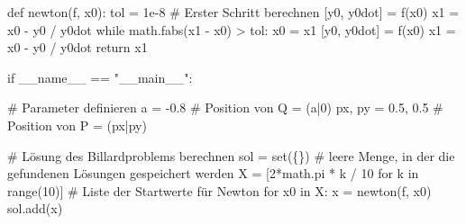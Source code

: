 \documentclass[
  a4paper,
  DIV=11]{scrreprt}
\newenvironment{Shaded}{\begin{snugshade}}{\end{snugshade}}
\newcommand{\BuiltInTok}[1]{\textcolor[rgb]{0.00,0.23,0.31}{#1}}
\newcommand{\CommentTok}[1]{\textcolor[rgb]{0.37,0.37,0.37}{#1}}
\newcommand{\ControlFlowTok}[1]{\textcolor[rgb]{0.00,0.23,0.31}{#1}}
\newcommand{\DecValTok}[1]{\textcolor[rgb]{0.68,0.00,0.00}{#1}}
\newcommand{\FloatTok}[1]{\textcolor[rgb]{0.68,0.00,0.00}{#1}}
\newcommand{\KeywordTok}[1]{\textcolor[rgb]{0.00,0.23,0.31}{#1}}
\newcommand{\NormalTok}[1]{\textcolor[rgb]{0.00,0.23,0.31}{#1}}
\newcommand{\OperatorTok}[1]{\textcolor[rgb]{0.37,0.37,0.37}{#1}}
\newcommand{\StringTok}[1]{\textcolor[rgb]{0.13,0.47,0.30}{#1}}
\newcommand{\VariableTok}[1]{\textcolor[rgb]{0.07,0.07,0.07}{#1}}
\theoremstyle{definition}
\theoremstyle{definition}
\theoremstyle{remark}
\begin{document}
\begin{tcolorbox}
\begin{Shaded}
\begin{Highlighting}[]
\KeywordTok{def}\NormalTok{ newton(f, x0):}
\NormalTok{    tol }\OperatorTok{=} \FloatTok{1e{-}8}
    \CommentTok{\# Erster Schritt berechnen}
\NormalTok{    [y0, y0dot] }\OperatorTok{=}\NormalTok{ f(x0)}
\NormalTok{    x1 }\OperatorTok{=}\NormalTok{ x0 }\OperatorTok{{-}}\NormalTok{ y0 }\OperatorTok{/}\NormalTok{ y0dot}
    \ControlFlowTok{while}\NormalTok{ math.fabs(x1 }\OperatorTok{{-}}\NormalTok{ x0) }\OperatorTok{\textgreater{}}\NormalTok{ tol:}
\NormalTok{        x0 }\OperatorTok{=}\NormalTok{ x1}
\NormalTok{        [y0, y0dot] }\OperatorTok{=}\NormalTok{ f(x0)}
\NormalTok{        x1 }\OperatorTok{=}\NormalTok{ x0 }\OperatorTok{{-}}\NormalTok{ y0 }\OperatorTok{/}\NormalTok{ y0dot}
    \ControlFlowTok{return}\NormalTok{ x1 }


\ControlFlowTok{if} \VariableTok{\_\_name\_\_} \OperatorTok{==} \StringTok{"\_\_main\_\_"}\NormalTok{:}

    \CommentTok{\# Parameter definieren}
\NormalTok{    a }\OperatorTok{=} \OperatorTok{{-}}\FloatTok{0.8}           \CommentTok{\# Position von Q = (a|0)}
\NormalTok{    px, py }\OperatorTok{=} \FloatTok{0.5}\NormalTok{, }\FloatTok{0.5}  \CommentTok{\# Position von P = (px|py)}

    \CommentTok{\# Lösung des Billardproblems berechnen}
\NormalTok{    sol }\OperatorTok{=} \BuiltInTok{set}\NormalTok{(\{\}) }\CommentTok{\# leere Menge, in der die gefundenen Lösungen gespeichert werden}
\NormalTok{    X }\OperatorTok{=}\NormalTok{ [}\DecValTok{2}\OperatorTok{*}\NormalTok{math.pi }\OperatorTok{*}\NormalTok{ k }\OperatorTok{/} \DecValTok{10} \ControlFlowTok{for}\NormalTok{ k }\KeywordTok{in} \BuiltInTok{range}\NormalTok{(}\DecValTok{10}\NormalTok{)]  }\CommentTok{\# Liste der Startwerte für Newton}
    \ControlFlowTok{for}\NormalTok{ x0 }\KeywordTok{in}\NormalTok{ X:}
\NormalTok{        x }\OperatorTok{=}\NormalTok{ newton(f, x0)}
\NormalTok{        sol.add(x)}


\end{Highlighting}
\end{Shaded}
\end{tcolorbox}
\end{document}
